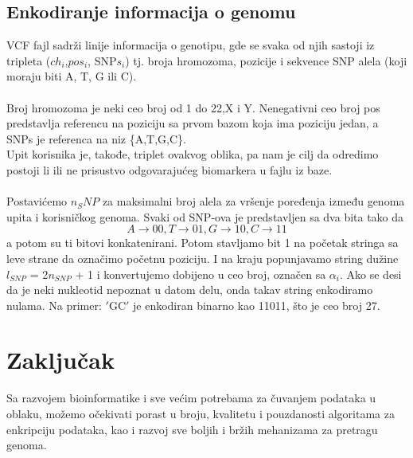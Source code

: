 \documentclass[a4paper]{article}
\begin{document}
\subsection{Enkodiranje informacija o genomu}
VCF fajl sadrži linije informacija o genotipu, gde se svaka od njih sastoji iz tripleta ($ch_i$,$pos_i$, SNP$s_i$) tj. broja hromozoma, pozicije i sekvence SNP alela  (koji moraju biti A, T, G ili C).\\\\
Broj hromozoma je neki ceo broj od 1 do 22,X i Y. Nenegativni ceo broj pos predstavlja referencu na poziciju sa prvom bazom koja ima poziciju jedan, a SNPs je referenca na niz \{A,T,G,C\}.\\
Upit korisnika je, takođe, triplet ovakvog oblika, pa nam je cilj da odredimo postoji li ili ne prisustvo odgovarajućeg biomarkera u fajlu iz baze. \\\\
Postavićemo $n_SNP$ za maksimalni broj alela za vršenje poređenja između genoma upita i korisničkog genoma. Svaki od SNP-ova je predstavljen sa dva bita tako da 
$$A \rightarrow 00, T \rightarrow 01, G \rightarrow 10, C \rightarrow 11$$
a potom su ti bitovi konkatenirani. Potom stavljamo bit 1 na početak stringa sa leve strane da označimo početnu poziciju. I na kraju popunjavamo string dužine $\textit{l}_{SNP}$ = 2$n_{SNP}$ + 1 i konvertujemo dobijeno u ceo broj, označen sa $\alpha_i$. Ako se desi da je neki nukleotid nepoznat u datom delu, onda takav string enkodiramo nulama. Na primer: $'$GC$'$ je enkodiran binarno kao 11011, što je ceo broj 27.

\section{Zaključak}
	Sa razvojem bioinformatike i sve većim potrebama za čuvanjem podataka u oblaku, možemo očekivati porast u broju, kvalitetu i pouzdanosti algoritama za enkripciju podataka, kao i razvoj sve boljih i bržih mehanizama za pretragu genoma.
\end{document}
